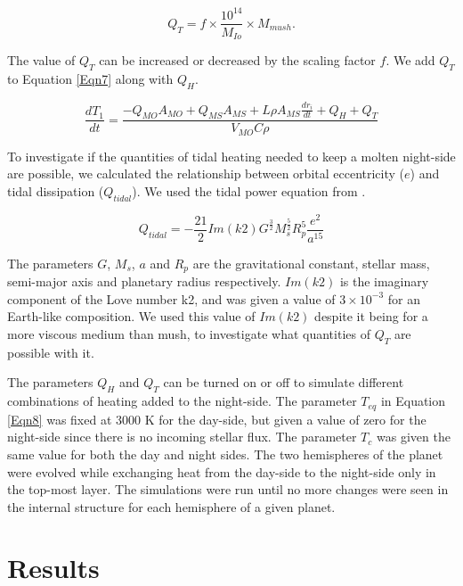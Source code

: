 \documentclass[fleqn,usenatbib]{mnras}
\begin{document}
\begin{equation}
\label{Eqn27}
Q_{T} = f \times \frac{10^{14}}{M_{Io}} \times M_{mush} .
\end{equation}

\noindent The value of $Q_{T}$ can be increased or decreased by the scaling factor $f$. We add $Q_{T}$ to Equation \ref{Eqn7} along with $Q_{H}$.


\begin{equation}
\label{Eqn28}
\frac{dT_{1}}{dt} = \frac{-Q_{MO} A_{MO} + Q_{MS} A_{MS} + L \rho A_{MS} \frac{dr_{i}}{dt} + Q_{H} + Q_{T}}{V_{MO} C \rho}
\end{equation}

\noindent To investigate if the quantities of tidal heating needed to keep a molten night-side are possible, we calculated the relationship between orbital eccentricity ($e$) and tidal dissipation ($Q_{tidal}$). We used the tidal power equation from \cite{Dris2015}. 

\begin{equation}
\label{Eqn29}
Q_{tidal} = -\frac{21}{2} Im(k2) G^{\frac{3}{2}} M_{s}^{\frac{5}{2}} R_{p}^{5} \frac{e^{2}}{a^{15}}
\end{equation}

\noindent The parameters $G$, $M_{s}$, $a$ and $R_{p}$ are the gravitational constant, stellar mass, semi-major axis and planetary radius respectively. $Im(k2)$ is the imaginary component of the Love number k2, and was given a value of $3 \times 10^{-3}$ for an Earth-like composition. We used this value of $Im(k2)$ despite it being for a more viscous medium than mush, to investigate what quantities of $Q_{T}$ are possible with it. 

The parameters $Q_{H}$ and $Q_{T}$ can be turned on or off to simulate different combinations of heating added to the night-side. The parameter $T_{eq}$ in Equation \ref{Eqn8} was fixed at 3000 K for the day-side, but given a value of zero for the night-side since there is no incoming stellar flux. The parameter $T_{c}$ was given the same value for both the day and night sides. The two hemispheres of the planet were evolved while exchanging heat from the day-side to the night-side only in the top-most layer. The simulations were run until no more changes were seen in the internal structure for each hemisphere of a given planet.





\section{Results}  \label{sec3}
\end{document}

